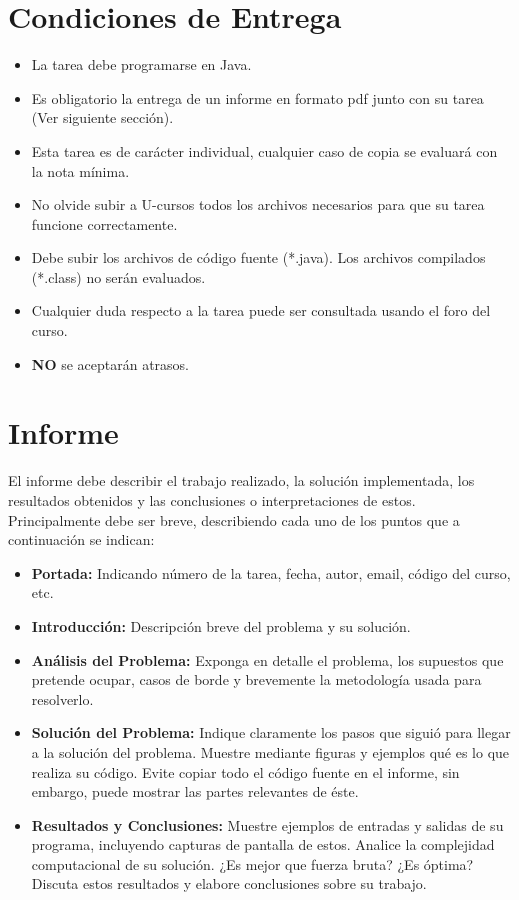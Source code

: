 \documentclass[dcc, usedate]{fcfmcourse}
\begin{document}
\section{Condiciones de Entrega}
\begin{itemize}
\item La tarea debe programarse en Java.
\item Es obligatorio la entrega de un informe en formato pdf junto con su tarea (Ver siguiente sección).
\item Esta tarea es de carácter individual, cualquier caso de copia se evaluará con la nota mínima.
\item No olvide subir a U-cursos todos los archivos necesarios para que su tarea funcione correctamente.
\item Debe subir los archivos de código fuente (*.java). Los archivos compilados (*.class) no serán evaluados.
\item Cualquier duda respecto a la tarea puede ser consultada usando el foro del curso.
\item \textbf{NO} se aceptarán atrasos.
\end{itemize}

\section{Informe}
El informe debe describir el trabajo realizado, la solución implementada, los resultados obtenidos y las conclusiones o interpretaciones de estos. Principalmente debe ser breve, describiendo cada uno de los puntos que a continuación se indican:
\begin{itemize}
\item \textbf{Portada:} Indicando número de la tarea, fecha, autor, email, código del curso, etc.
\item \textbf{Introducción:} Descripción breve del problema y su solución.
\item \textbf{Análisis del Problema:} Exponga en detalle el problema, los supuestos que pretende ocupar, casos de borde y brevemente la metodología usada para resolverlo.
\item \textbf{Solución del Problema:} Indique claramente los pasos que siguió para llegar a la solución del problema. Muestre mediante figuras y ejemplos qué es lo que realiza su código. Evite copiar todo el código fuente en el informe, sin embargo, puede mostrar las partes relevantes de éste.
\item \textbf{Resultados y Conclusiones:} Muestre ejemplos de entradas y salidas de su programa, incluyendo capturas de pantalla de estos. Analice la complejidad computacional de su solución. ¿Es mejor que fuerza bruta? ¿Es óptima? Discuta estos resultados y elabore conclusiones sobre su trabajo.
\end{itemize}
\end{document}

